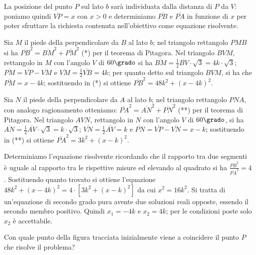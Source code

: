 \begin{soluzione}
La posizione del punto $ P $ sul lato $ b $ sarà individuata dalla distanza di $ P $ da $ V $: poniamo quindi $\overline {VP} = x$ con $x > 0$ e determiniamo
$\overline {PB}$ e $\overline {PA}$ in funzione di $ x $ per poter sfruttare la richiesta contenuta nell'obiettivo come equazione risolvente.

Sia $ M $ il piede della perpendicolare da $ B $ al lato $ b $; nel triangolo rettangolo $ PMB $ si ha $\overline {PB}^{2} = \overline {BM}^{2} + \overline {PM}^{2}$ (*) per il teorema di Pitagora. Nel triangolo $ BVM $, rettangolo in $ M $ con l'angolo $ V $ di $ 60\grado $ si ha $\overline {BM} = \frac{1}{2} \overline {BV} \cdot \sqrt{3} = 4 k\cdot \sqrt{3}$; $\overline {PM} = \overline {VP} - \overline {VM}$ e $\overline {VM} = \frac{1}{2} \overline {VB} = 4 k$; per quanto detto sul triangolo $ BVM $, si ha che $\overline {PM} = x - 4 k$; sostituendo in (*) si ottiene $\overline {PB}^{2} = 48 k^{2} + ( x - 4 k )^{2}$.

Sia $ N $ il piede della perpendicolare da $ A $ al lato $ b $; nel triangolo rettangolo $ PNA $, con analogo ragionamento otteniamo: $\overline {PA}^{2} = \overline {AN}^{2} + \overline {PN}^{2}$ (**) per il teorema di Pitagora. Nel triangolo $ AVN $, rettangolo in $ N $ con l'angolo $ V $ di $ 60\grado $, si ha
$\overline {AN} = \frac{1}{2} \overline {AV} \cdot \sqrt{3} = k \cdot \sqrt{3}$; $ \overline {VN} = \frac{1}{2} \overline {AV} = k$ e $\overline {PN} = \overline {VP} - \overline {VN} = x - k$; sostituendo in (**) si ottiene $\overline {PA}^{2} = 3 k^{2} + ( x - k )^{2}$.

Determiniamo l'equazione risolvente ricordando che il rapporto tra due segmenti è uguale al rapporto tra le rispettive misure ed elevando al quadrato
si ha $\frac{\overline {PB}^{2}}{\overline {PA}^{2}} = 4$. Sostituendo quanto trovato si ottiene l'equazione $48 k^{2} + ( x - 4 k )^{2} = 4 \cdot \left[ 3 k^{2} + ( x - k )^{2} \right]$ da cui $x^{2} = 16 k^{2}$. Si tratta di un'equazione di secondo grado pura avente due soluzioni reali opposte, essendo il secondo membro positivo. Quindi $x_{1} = -4 k$ e $x_2=4 k$; per le condizioni poste solo $ x_2 $ è accettabile.

Con quale punto della figura tracciata inizialmente viene a coincidere il punto $ P $ che risolve il problema?
\end{soluzione}

\vspazio\ovalbox{\risolvii \ref{ese:3.151}, \ref{ese:3.152}, \ref{ese:3.153}, \ref{ese:3.154}, \ref{ese:3.155}, \ref{ese:3.156}, \ref{ese:3.157}, \ref{ese:3.158}, \ref{ese:3.159}}

\newpage

\cleardoublepage

